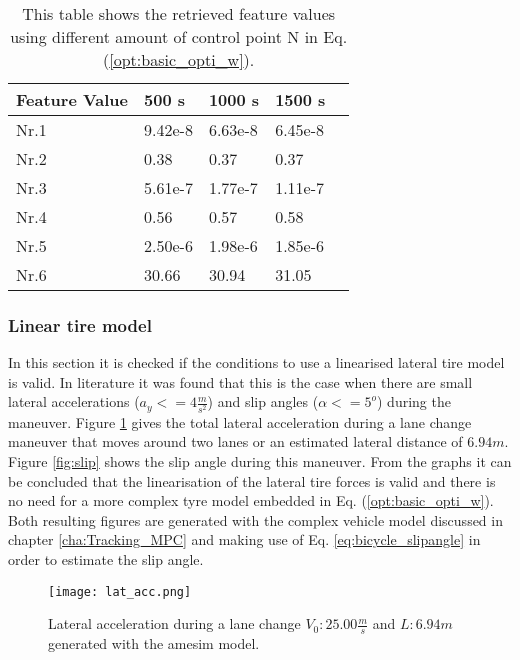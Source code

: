 \begin{table}[h!]
	\centering
	\begin{tabular}{@{}llllr@{}} \toprule
		\textbf{Feature Value}    & 500 s  & 1000 s      & 1500 s\\ \midrule
		Nr.1       & 9.42e-8     & 6.63e-8   & 6.45e-8\\
		Nr.2       & 0.38        & 0.37      & 0.37\\
		Nr.3       & 5.61e-7     & 1.77e-7   & 1.11e-7 \\
		Nr.4       & 0.56        & 0.57      & 0.58\\
		Nr.5       & 2.50e-6     & 1.98e-6   & 1.85e-6\\
		Nr.6       & 30.66       & 30.94     & 31.05\\ \bottomrule
	\end{tabular}
	\caption{This table shows the retrieved feature values using different amount of control point N in Eq. (\ref{opt:basic_opti_w}).}
	\label{tab:GD_N}
\end{table}


\subsubsection{Linear tire model}
In this section it is checked if the conditions to use a linearised lateral tire model is valid. In literature \cite{TongDuySon2019} it was found that this is the case when there are small lateral accelerations ($a_y <= 4 \frac{m}{s^2}$) and slip angles ($\alpha <= 5^o $) during the maneuver. Figure \ref{fig:lat} gives the total lateral acceleration during a lane change maneuver that moves around two lanes or an estimated lateral distance of $6.94 m$. Figure \ref{fig:slip} shows the slip angle during this maneuver. From the graphs it can be concluded that the linearisation of the lateral tire forces is valid and there is no need for a more complex tyre model embedded in Eq. (\ref{opt:basic_opti_w}).  Both resulting figures are generated with the complex vehicle model discussed in chapter \ref{cha:Tracking_MPC} and making use of Eq. \ref{eq:bicycle_slipangle} in order to estimate the slip angle.

 \begin{figure}[h!]
	\centering
	\texttt{[image: lat\_acc.png]}
	\caption{Lateral acceleration during a lane change $V_0: 25.00 \frac{m}{s}$ and $L:6.94 m$ generated with the amesim model.}
	\label{fig:lat}
\end{figure}

